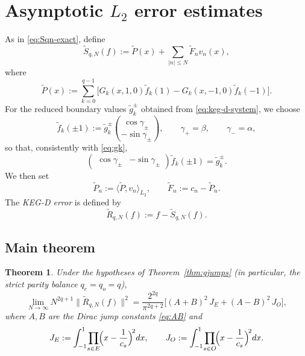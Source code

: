 \documentclass[11pt,a4paper]{article}
\newtheorem{theorem}{Theorem}[section]
\theoremstyle{definition}
\begin{document}
\section{Asymptotic $L_2$ error estimates}\label{sec:l2}
As in \eqref{eq:Sqn-exact}, define
\begin{equation}\label{eq:Sqn-tilde}
\widetilde S_{q,N}(f)
:=
\widetilde P(x)
+
\sum_{|n|\leq N}\widetilde F_n v_n(x),
\end{equation}
where
\[
\widetilde P(x)
:=
\sum_{k=0}^{q-1}
\bigl[
G_k(x,1,0)\widetilde f_k(1)
-
G_k(x,-1,0)\widetilde f_k(-1)
\bigr].
\]
For the reduced boundary values $\widetilde g_k^\pm$ obtained from
\eqref{eq:keg-d-system}, we choose
\[
\widetilde f_k(\pm1)
:=
\widetilde g_k^\pm
\binom{\cos\gamma_\pm}{-\sin\gamma_\pm},
\qquad
\gamma_+=\beta,
\qquad
\gamma_-=\alpha,
\]
so that, consistently with \eqref{eq:gk},
\[
\begin{pmatrix}
\cos\gamma_\pm & -\sin\gamma_\pm
\end{pmatrix}
\widetilde f_k(\pm1)
=
\widetilde g_k^\pm.
\]
We then set
\[
\widetilde P_n
:=
\langle \widetilde P,v_n\rangle_{L_2},
\qquad
\widetilde F_n
:=
c_n-\widetilde P_n.
\]
The \emph{KEG-D error} is defined by
\[
\widetilde R_{q,N}(f)
:=
f-\widetilde S_{q,N}(f).
\]


\subsection{Main theorem}

\begin{theorem}\label{thm:L2}
Under the hypotheses of Theorem~\ref{thm:gjumps} (in particular, the
strict parity balance $q_e=q_o=q$),
\begin{equation}\label{eq:L2}
\lim_{N\to\infty}N^{2q+1}\|\widetilde R_{q,N}(f)\|^2
=\frac{2^{2q}}{\pi^{2q+2}}\bigl[(A+B)^2\,J_E+(A-B)^2\,J_O\bigr],
\end{equation}
where $A,B$ are the Dirac jump constants \eqref{eq:AB} and
\begin{equation}\label{eq:JEO}
J_E:=\int_{-1}^{1}\!\prod_{s\in E}\!\Bigl(x-\frac{1}{c_s}\Bigr)^{\!2}dx,
\qquad
J_O:=\int_{-1}^{1}\!\prod_{s\in O}\!\Bigl(x-\frac{1}{c_s}\Bigr)^{\!2}dx.
\end{equation}
\end{theorem}
\end{document}
